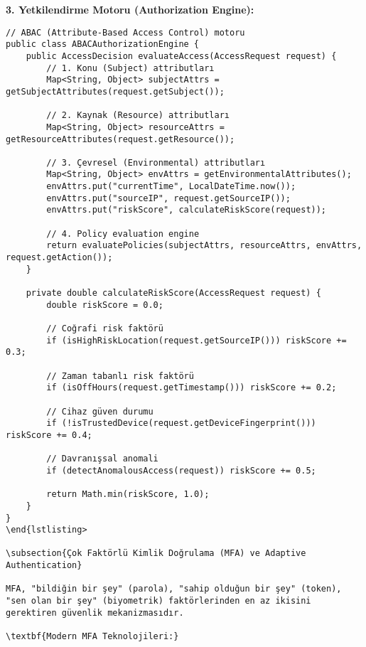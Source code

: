 \textbf{3. Yetkilendirme Motoru (Authorization Engine):}
\begin{lstlisting}[breaklines=true,basicstyle=\ttfamily\footnotesize]
// ABAC (Attribute-Based Access Control) motoru
public class ABACAuthorizationEngine {
    public AccessDecision evaluateAccess(AccessRequest request) {
        // 1. Konu (Subject) attributları
        Map<String, Object> subjectAttrs = getSubjectAttributes(request.getSubject());
        
        // 2. Kaynak (Resource) attributları  
        Map<String, Object> resourceAttrs = getResourceAttributes(request.getResource());
        
        // 3. Çevresel (Environmental) attributları
        Map<String, Object> envAttrs = getEnvironmentalAttributes();
        envAttrs.put("currentTime", LocalDateTime.now());
        envAttrs.put("sourceIP", request.getSourceIP());
        envAttrs.put("riskScore", calculateRiskScore(request));
        
        // 4. Policy evaluation engine
        return evaluatePolicies(subjectAttrs, resourceAttrs, envAttrs, request.getAction());
    }
    
    private double calculateRiskScore(AccessRequest request) {
        double riskScore = 0.0;
        
        // Coğrafi risk faktörü
        if (isHighRiskLocation(request.getSourceIP())) riskScore += 0.3;
        
        // Zaman tabanlı risk faktörü
        if (isOffHours(request.getTimestamp())) riskScore += 0.2;
        
        // Cihaz güven durumu
        if (!isTrustedDevice(request.getDeviceFingerprint())) riskScore += 0.4;
        
        // Davranışsal anomali
        if (detectAnomalousAccess(request)) riskScore += 0.5;
        
        return Math.min(riskScore, 1.0);
    }
}
\end{lstlisting>

\subsection{Çok Faktörlü Kimlik Doğrulama (MFA) ve Adaptive Authentication}

MFA, "bildiğin bir şey" (parola), "sahip olduğun bir şey" (token), "sen olan bir şey" (biyometrik) faktörlerinden en az ikisini gerektiren güvenlik mekanizmasıdır.

\textbf{Modern MFA Teknolojileri:}


\end{lstlisting}
